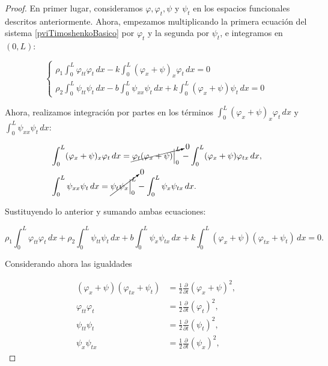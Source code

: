 \begin{proof}
    En primer lugar, consideramos $\varphi, \varphi_t, \psi$ y $\psi_t$ en los espacios funcionales descritos anteriormente. Ahora, empezamos multiplicando la primera ecuación del sistema \eqref{pviTimoshenkoBasico} por $\varphi_t$ y la segunda por $\psi_t$, e integramos en $(0,L)$:

    \begin{equation*}
    \begin{cases}
    \displaystyle \rho_1 \int_0^L \varphi_{tt} \varphi_t \, dx - k \int_0^L (\varphi_x + \psi)_x \varphi_t \, dx = 0\\
    \displaystyle \rho_2 \int_0^L \psi_{tt} \psi_t \, dx - b\int_0^L \psi_{xx}\psi_t \, dx + k \int_0^L (\varphi_x + \psi) \psi_t \, dx = 0
    \end{cases}
    \end{equation*}

    Ahora, realizamos integración por partes en los términos $\int_0^L (\varphi_x + \psi)_x \varphi_t \, dx$ y $\int_0^L \psi_{xx}\psi_t \, dx$:

    \begin{align*}
        &\int_0^L (\varphi_x + \psi)_x \varphi_t \, dx = \cancelto{0}{\varphi_t(\varphi_x + \psi)\Big|_0^L} - \int_0^L(\varphi_x + \psi) \varphi_{tx} \, dx,\\
        &\int_0^L \psi_{xx}\psi_t \, dx = \cancelto{0}{\psi_t \psi_x\Big|_0^L} - \int_0^L \psi_x \psi_{tx} \, dx.
    \end{align*}

    Sustituyendo lo anterior y sumando ambas ecuaciones:

    \[\rho_1 \int_0^L\varphi_{tt}\varphi_t \, dx + \rho_2 \int_0^L \psi_{tt}\psi_t \, dx + b\int_0^L \psi_x \psi_{tx} \, dx + k \int_0^L (\varphi_x + \psi)(\varphi_{tx} + \psi_t) \, dx = 0.\]

    Considerando ahora las igualdades

    \begin{align*}
        (\varphi_x + \psi)(\varphi_{tx} + \psi_t) &= \frac{1}{2}\frac{\partial}{\partial t}(\varphi_x + \psi)^2,\\
        \varphi_{tt}\varphi_t &= \frac{1}{2}\frac{\partial}{\partial t}(\varphi_t)^2,\\
        \psi_{tt}\psi_t &= \frac{1}{2}\frac{\partial}{\partial t}(\psi_t)^2,\\
        \psi_x \psi_{tx} &= \frac{1}{2}\frac{\partial}{\partial t}(\psi_x)^2,
    \end{align*}


\end{proof}

